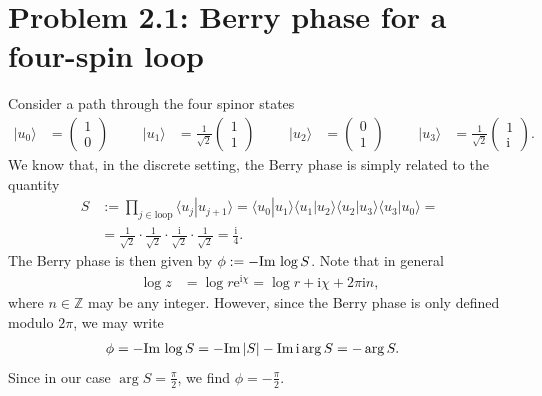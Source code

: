 \documentclass[english, parskip=full]{scrartcl}
\title{\titel}
\author{\autor}
\date{\today}
\newcommand{\brak}{}
\newcommand{\tecxt}{}
\newcommand{\Ket}{}
\renewcommand{\i}{\text{i}}
\newcommand{\e}{\text{e}}
\begin{document}
\maketitle  %

\section*{Problem 2.1: Berry phase for a four-spin loop}
Consider a path through the four spinor states
\begin{align}
\Ket | u_0 \rangle &= \begin{pmatrix}
1 \\ 0
\end{pmatrix} &&& \Ket | u_1 \rangle &= \frac{1}{\sqrt{2}}\begin{pmatrix}
1 \\ 1
\end{pmatrix} &&& \Ket | u_2 \rangle &= \begin{pmatrix}
0 \\ 1
\end{pmatrix} &&& \Ket | u_3 \rangle &= \frac{1}{\sqrt{2}}\begin{pmatrix}
1 \\ \i
\end{pmatrix} .
\end{align}
We know that, in the discrete setting, the Berry phase is simply related to the quantity
\begin{align}
S &:= \prod_{j\in\tecxt\text{loop}} \brak\langle u_j | u_{j+1} \rangle = \brak\langle u_0 | u_1 \rangle\brak\langle u_1 | u_2 \rangle \brak\langle u_2 | u_3 \rangle \brak\langle u_3 | u_0 \rangle = \label{eqn:S discrete Berry phase}\\
&= \frac{1}{\sqrt{2}}\cdot \frac{1}{\sqrt{2}} \cdot \frac{\i}{\sqrt{2}} \cdot \frac{1}{\sqrt{2}} = \frac{\i}{4}.
\end{align}
The Berry phase is then given by $\phi := -\tecxt\text{Im\,}\log S$.
Note that in general
\begin{align}
\log z &= \log r\e^{\i\chi} = \log r + \i\chi + 2\pi\i n,
\end{align}
where $n\in\mathbb{Z}$ may be any integer.
However, since the Berry phase is only defined modulo $2\pi$, we may write
\begin{align}
\phi &= -\tecxt\text{Im\,}\log S = -\tecxt\text{Im\,} |S| -\tecxt\text{Im\,}\i\arg S = -\arg S.
\end{align}
Since in our case $\arg S = \frac{\pi}{2}$, we find $\phi = -\frac{\pi}{2}$.
\end{document}
